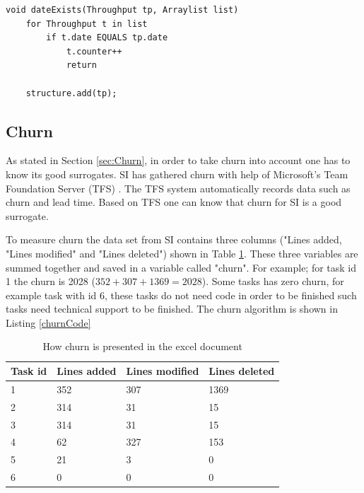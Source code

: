 \documentclass[UKenglish]{ifimaster}  %
\begin{document}
\begin{minipage}{\textwidth}
\begin{lstlisting}[caption=Pseudocode example of how throughput is measured, label=throughputCode]
void dateExists(Throughput tp, Arraylist list)
	for Throughput t in list
		if t.date EQUALS tp.date
			t.counter++
			return
			
	structure.add(tp);
\end{lstlisting}
 \end{minipage}


\subsection{Churn}
\label{sec:churn}
As stated in Section \ref{sec:Churn}, in order to take churn into account one has to know its good surrogates. SI has gathered churn with help of Microsoft's Team Foundation Server (TFS) \parencite{Dag}. The TFS system automatically records data such as churn and lead time. Based on TFS one can know that churn for SI is a good surrogate.

To measure churn the data set from SI contains three columns ("Lines added, "Lines modified" and "Lines deleted") shown in Table \ref{table:churn}. These three variables are summed together and saved in a  variable called "churn".  For example; for task id 1 the churn is 2028 ($352+307+1369 = 2028$). Some tasks has zero churn, for example task with id 6, these tasks do not need code in order to be finished such tasks need technical support to be finished. The churn algorithm is shown in Listing \ref{churnCode}

\begin{table}[!ht]
\begin{center}
    \begin{tabular}{| l | l | l | l |}
    \hline
\bf{Task id} & \bf{Lines added} & \bf{Lines modified}  & \bf{Lines deleted} \\ \hline
1&352&307&1369\\ \hline
2&314 & 31 & 15 \\ \hline
3&314&31 & 15\\ \hline
4&62&327&153 \\ \hline
5&21&3&0 \\ \hline
6&0&0&0 \\ \hline
\end{tabular}
\caption{How churn is presented in the excel document}
\label{table:churn} %
\end{center}
\end{table}
\end{document}
